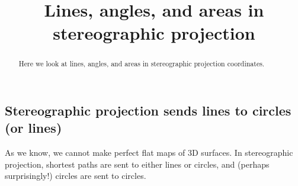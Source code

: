 \documentclass[newpage,hints,handout]{ximera}
\title{Lines, angles, and areas in stereographic projection}
\begin{document}
\begin{abstract}
Here we look at lines, angles, and areas in stereographic projection coordinates.
\end{abstract}
\maketitle


\subsection{Stereographic projection sends lines to circles (or lines)}

As we know, we cannot make perfect flat maps of 3D surfaces. In stereographic
projection, shortest paths are sent to either lines or circles, and (perhaps
surprisingly!) circles are sent to circles.
\end{document}

